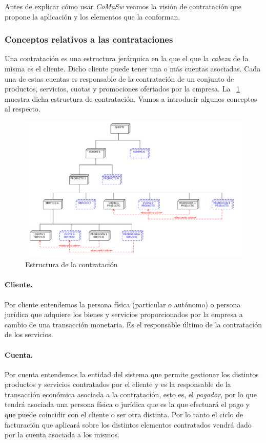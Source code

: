 Antes de explicar cómo usar \emph{CoMaSw} veamos la visión de contratación que propone la aplicación y los elementos que la conforman.



\subsubsection{Conceptos relativos a las contrataciones}
\label{sub:contratacion-conceptos}

Una contratación es una estructura jerárquica en la que el que la \textit{cabeza} de la misma es el cliente. Dicho cliente puede tener una o más cuentas asociadas. Cada una de estas cuentas es responsable de la contratación de un conjunto de productos, servicios, cuotas y promociones ofertados por la empresa. La \figurename~\ref{fig:estructura-contratacion} muestra dicha estructura de contratación. Vamos a introducir algunos conceptos al respecto.

\begin{figure}
  \centering
  \includegraphics[width=\textwidth]{imaxes/estructura-contratacion.png}
  \caption{Estructura de la contratación}
  \label{fig:estructura-contratacion}
\end{figure}

\paragraph{Cliente.} Por cliente entendemos la persona física (particular o autónomo) o persona jurídica que adquiere los bienes y servicios proporcionados por la empresa a cambio de una transacción monetaria. Es el responsable último de la contratación de los servicios.

\paragraph{Cuenta.} Por cuenta entendemos la entidad del sistema que permite gestionar los distintos productos y servicios contratados por el cliente y es la responsable de la transacción económica asociada a la contratación, esto es, el \textit{pagador}, por lo que tendrá asociada una persona física o jurídica que es la que efectuará el pago y que puede coincidir con el cliente o ser otra distinta. Por lo tanto el ciclo de facturación que aplicará sobre los distintos elementos contratados vendrá dado por la cuenta asociada a los mismos.

